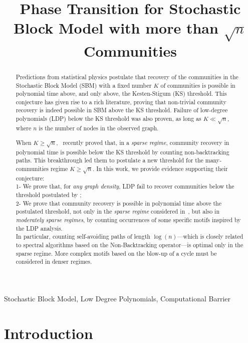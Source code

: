 \documentclass[final]{colt2026}
\title[Phase Transition in SBM]{Phase Transition for Stochastic Block Model with more than $\sqrt{n}$ Communities}
\newcommand{\1}{\mathbf{1}}
\begin{document}
\maketitle



\begin{abstract}
   Predictions from statistical physics postulate that recovery of the communities in the Stochastic Block Model (SBM) with a fixed number $K$ of communities is possible in polynomial time above, and only above, the Kesten-Stigum (KS) threshold. This conjecture has given rise to a rich literature,  proving that non-trivial community recovery is indeed possible in SBM above the KS threshold. Failure of low-degree polynomials (LDP) below the KS threshold was also proven, as long as $K\ll \sqrt{n}$, where $n$ is the number of nodes in the observed graph.
    
    When $K\geq \sqrt{n}$,~\cite{pmlr-v291-chin25a} recently proved that,  in a \emph{sparse regime},  community recovery  in polynomial time is possible below the KS threshold by counting non-backtracking paths. This breakthrough led them to postulate a new threshold for the many-communities regime $K\geq \sqrt{n}$. In this work, we provide evidence supporting their conjecture:\\
 1- We prove that, for \emph{any graph density}, LDP fail to recover communities below the threshold postulated by \cite{pmlr-v291-chin25a} ;\\
 2- We prove that community recovery is possible in polynomial time above the postulated threshold, not only in the \emph{sparse regime} considered in~\cite{pmlr-v291-chin25a}, but also in \emph{moderately sparse regimes}, by counting occurrences of some specific motifs inspired by the LDP analysis.\\
 In particular, counting  self-avoiding paths of length $\log(n)$—which is closely related to spectral algorithms based on the Non-Backtracking operator—is optimal only in the sparse regime. More complex motifs based on the blow-up of a cycle must be considered in denser regimes. 
\end{abstract}


\begin{keywords}%
  Stochastic Block Model, Low Degree Polynomials, Computational Barrier
\end{keywords}


\section{Introduction}
\end{document}
